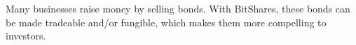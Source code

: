 Many businesses raise money by selling bonds. With BitShares, these bonds can
be made tradeable and/or fungible, which makes them more compelling to
investors.
